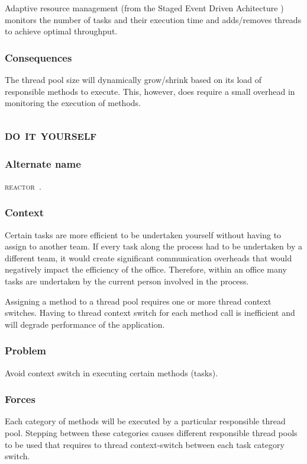 \documentclass[prodmode]{style/acmlarge}
\begin{document}
Adaptive resource management (from the Staged Event Driven Achitecture
\cite{seda}) monitors the number of tasks and their execution time and
adds/removes threads to achieve optimal throughput.

\subsubsection*{Consequences} The thread pool size will dynamically grow/shrink
based on its load of responsible methods to execute.  This, however, does
require a small overhead in monitoring the execution of methods.



\subsection{\textsc{\textbf{do it yourself}}}

\subsubsection*{Alternate name} \textsc{reactor}~\cite{reactor}.

\subsubsection*{Context} Certain tasks are more efficient to be undertaken
yourself without having to assign to another team.  If every task along the
process had to be undertaken by a different team, it would create significant
communication overheads that would negatively impact the efficiency of the
office.  Therefore, within an office many tasks are undertaken by the current
person involved in the process.

Assigning a method to a thread pool requires one or more thread context
switches.  Having to thread context switch for each method call is inefficient
and will degrade performance of the application.

\subsubsection*{Problem} Avoid context switch in executing certain methods (tasks).

\subsubsection*{Forces} Each category of methods will be executed by a particular
responsible thread pool.  Stepping between these categories causes different
responsible thread pools to be used that requires to thread context-switch between
each task category switch.
\end{document}
